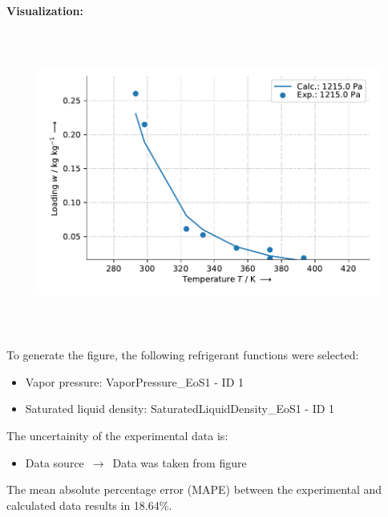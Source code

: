 \textbf{Visualization:}
%
\begin{figure}[!htp]
{\noindent\includegraphics[height=10cm, keepaspectratio]{figs/ads/ads_Water_silica_gel_pellet_Fuji_A_Freundlich_1.pdf}}
\end{figure}
%

To generate the figure, the following refrigerant functions were selected:
\begin{itemize}
\item Vapor pressure: VaporPressure\_EoS1 - ID 1
\item Saturated liquid density: SaturatedLiquidDensity\_EoS1 - ID 1
\end{itemize}

The uncertainity of the experimental data is:
\begin{itemize}
\item Data source $\,\to\,$ Data was taken from figure
\end{itemize}

The mean absolute percentage error (MAPE) between the experimental and calculated data results in 18.64\%.
\FloatBarrier
\newpage
